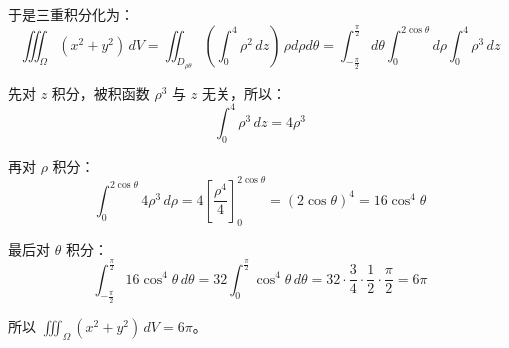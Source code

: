 \begin{myexample}
    
    于是三重积分化为：
    \[
    \iiint_{\Omega} (x^2+y^2)\,dV
    = \iint_{D_{\rho\theta}}\left(\int_{0}^{4} \rho^2 \, dz\right) \, \rho d\rho d\theta
    = \int_{-\frac{\pi}{2}}^{\frac{\pi}{2}} d\theta \int_{0}^{2\cos\theta} d\rho \int_{0}^{4} \rho^3 \, dz
    \]

    先对 \(z\) 积分，被积函数 \(\rho^3\) 与 \(z\) 无关，所以：
    \[
    \int_{0}^{4} \rho^3 \, dz = 4\rho^3
    \]

    再对 \(\rho\) 积分：
    \[
    \int_{0}^{2\cos\theta} 4\rho^3\,d\rho = 4\left[ \frac{\rho^4}{4} \right]_{0}^{2\cos\theta} = (2\cos\theta)^4 = 16\cos^4\theta
    \]

    最后对 \(\theta\) 积分：
    \[
    \int_{-\frac{\pi}{2}}^{\frac{\pi}{2}} 16\cos^4\theta\,d\theta
    = 32 \int_{0}^{\frac{\pi}{2}} \cos^4\theta\,d\theta
    = 32 \cdot \frac{3}{4}\cdot\frac{1}{2}\cdot\frac{\pi}{2} = 6\pi
    \]

    所以 \(\iiint_{\Omega} (x^2+y^2)\,dV = 6\pi\)。
\end{myexample}

